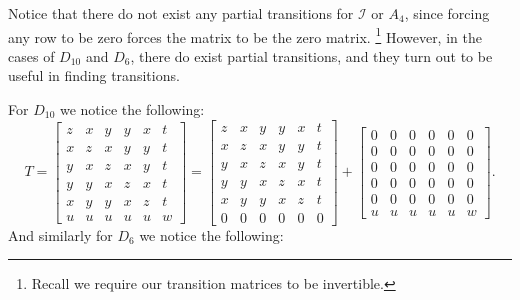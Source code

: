 \documentclass[a4paper,10pt]{article}
\let\oldfootnote\footnote
\renewcommand{\footnote}{\unskip\oldfootnote}
\theoremstyle{plain}
\theoremstyle{definition}
\theoremstyle{remark}
\begin{document}
Notice that there do not exist any partial transitions for \(\mathcal{I}\) or \(A_4\), since forcing any row to be zero forces the matrix to be the zero matrix.
\footnote{Recall we require our transition matrices to be invertible.}
However, in the cases of \(D_{10}\) and \(D_6\), there do exist partial transitions, and they turn out to be useful in finding transitions.

\noindent For \(D_{10}\) we notice the following:
\[T = \begin{bmatrix}
	z & x & y & y & x & t \\
	x & z & x & y & y & t \\
	y & x & z & x & y & t \\
	y & y & x & z & x & t \\
	x & y & y & x & z & t \\
	u & u & u & u & u & w
\end{bmatrix} = \begin{bmatrix}
	z & x & y & y & x & t \\
	x & z & x & y & y & t \\
	y & x & z & x & y & t \\
	y & y & x & z & x & t \\
	x & y & y & x & z & t \\
	0 & 0 & 0 & 0 & 0 & 0
\end{bmatrix} + \begin{bmatrix}
	0 & 0 & 0 & 0 & 0 & 0 \\
	0 & 0 & 0 & 0 & 0 & 0 \\
	0 & 0 & 0 & 0 & 0 & 0 \\
	0 & 0 & 0 & 0 & 0 & 0 \\
	0 & 0 & 0 & 0 & 0 & 0 \\
	u & u & u & u & u & w
\end{bmatrix}.\]
And similarly for \(D_6\) we notice the following:
\end{document}
